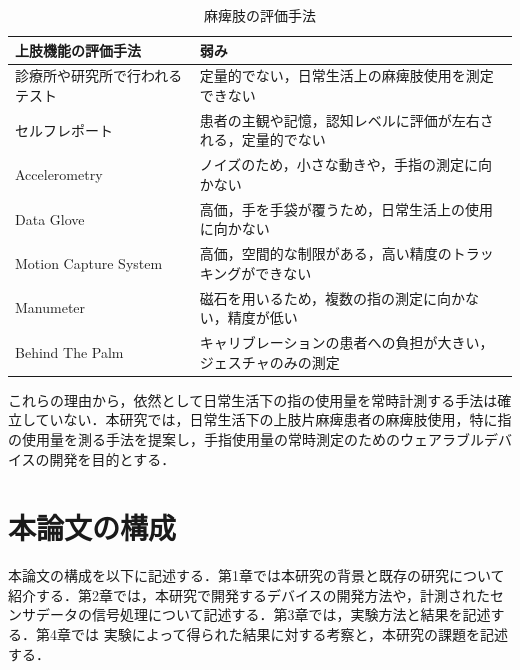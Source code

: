 \begin{table}[H]
  \caption{麻痺肢の評価手法}
  \label{table:measure}
  \centering
  \begin{tabular}{ll}
    \hline
    上肢機能の評価手法 & 弱み \\
    \hline \hline 
    診療所や研究所で行われるテスト   & 定量的でない，日常生活上の麻痺肢使用を測定できない \\
    セルフレポート & 患者の主観や記憶，認知レベルに評価が左右される，定量的でない\\
    Accelerometry   & ノイズのため，小さな動きや，手指の測定に向かない \\
    Data Glove  &  高価，手を手袋が覆うため，日常生活上の使用に向かない \\
    Motion Capture System   & 高価，空間的な制限がある，高い精度のトラッキングができない \\
    Manumeter  & 磁石を用いるため，複数の指の測定に向かない，精度が低い\\
    Behind The Palm   & キャリブレーションの患者への負担が大きい，ジェスチャのみの測定\\ 
    \hline
  \end{tabular}
\end{table}

これらの理由から，依然として日常生活下の指の使用量を常時計測する手法は確立していない．本研究では，日常生活下の上肢片麻痺患者の麻痺肢使用，特に指の使用量を測る手法を提案し，手指使用量の常時測定のためのウェアラブルデバイスの開発を目的とする．


\section{本論文の構成}
本論文の構成を以下に記述する．第1章では本研究の背景と既存の研究について紹介する．第2章では，本研究で開発するデバイスの開発方法や，計測されたセンサデータの信号処理について記述する．第3章では，実験方法と結果を記述する．第4章では
実験によって得られた結果に対する考察と，本研究の課題を記述する．